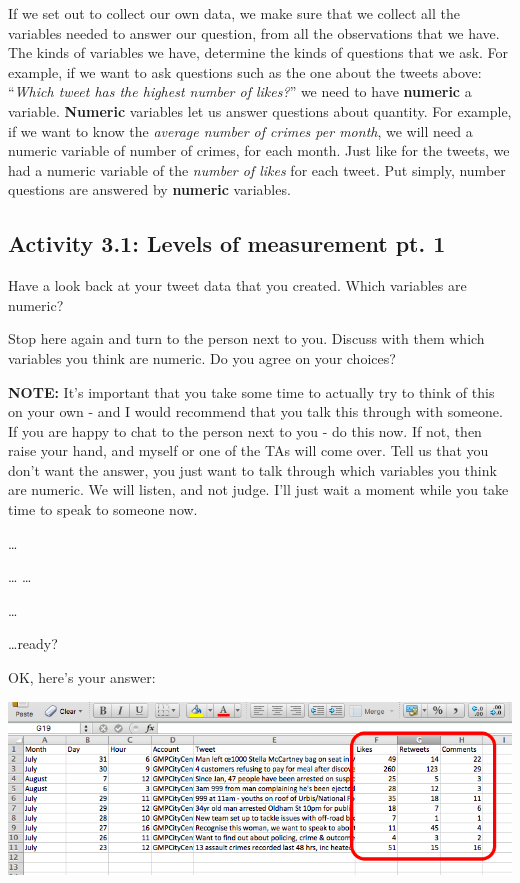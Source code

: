 \documentclass[]{book}
\theoremstyle{definition}
\theoremstyle{definition}
\theoremstyle{definition}
\theoremstyle{remark}
\begin{document}
If we set out to collect our own data, we make sure that we collect all
the variables needed to answer our question, from all the observations
that we have. The kinds of variables we have, determine the kinds of
questions that we ask. For example, if we want to ask questions such as
the one about the tweets above: ``\emph{Which tweet has the highest
number of likes?}'' we need to have \textbf{numeric} a variable.
\textbf{Numeric} variables let us answer questions about quantity. For
example, if we want to know the \emph{average number of crimes per
month}, we will need a numeric variable of number of crimes, for each
month. Just like for the tweets, we had a numeric variable of the
\emph{number of likes} for each tweet. Put simply, number questions are
answered by \textbf{numeric} variables.

\hypertarget{activity-3.1-levels-of-measurement-pt.-1}{%
\subsection{Activity 3.1: Levels of measurement pt.
1}\label{activity-3.1-levels-of-measurement-pt.-1}}

 Have a look back at your tweet data that you created. Which variables
are numeric?

Stop here again and turn to the person next to you. Discuss with them
which variables you think are numeric. Do you agree on your choices?

\textbf{NOTE:} It's important that you take some time to actually try to
think of this on your own - and I would recommend that you talk this
through with someone. If you are happy to chat to the person next to you
- do this now. If not, then raise your hand, and myself or one of the
TAs will come over. Tell us that you don't want the answer, you just
want to talk through which variables you think are numeric. We will
listen, and not judge. I'll just wait a moment while you take time to
speak to someone now.

\ldots{}

\ldots{} \ldots{}

\ldots{}

\ldots{}ready?

OK, here's your answer:

\includegraphics{imgs/num_vars.png}
\end{document}
